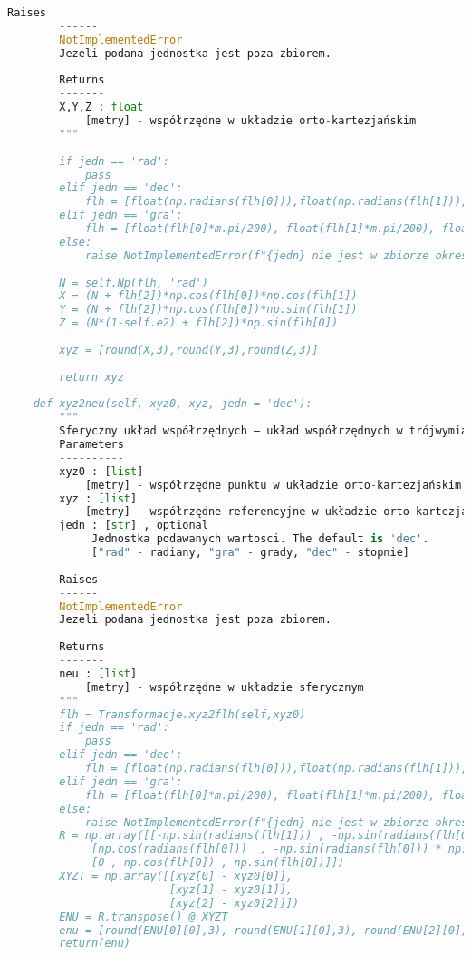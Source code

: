 \begin{lstlisting}[caption={\emph{Treść programu}}, language=Python]
        Raises
        ------
        NotImplementedError
        Jezeli podana jednostka jest poza zbiorem.
       
        Returns
        -------
        X,Y,Z : float
            [metry] - współrzędne w układzie orto-kartezjańskim
        """
        
        if jedn == 'rad':
            pass
        elif jedn == 'dec':
            flh = [float(np.radians(flh[0])),float(np.radians(flh[1])),float(flh[2])]
        elif jedn == 'gra':
            flh = [float(flh[0]*m.pi/200), float(flh[1]*m.pi/200), float(flh[2])]
        else:
            raise NotImplementedError(f"{jedn} nie jest w zbiorze okreslen")
            
        N = self.Np(flh, 'rad')
        X = (N + flh[2])*np.cos(flh[0])*np.cos(flh[1])
        Y = (N + flh[2])*np.cos(flh[0])*np.sin(flh[1])
        Z = (N*(1-self.e2) + flh[2])*np.sin(flh[0])
        
        xyz = [round(X,3),round(Y,3),round(Z,3)]
        
        return xyz
    
    def xyz2neu(self, xyz0, xyz, jedn = 'dec'):
        """
        Sferyczny układ współrzędnych – układ współrzędnych w trójwymiarowej przestrzeni euklidesowej.
        Parameters
        ----------
        xyz0 : [list]
            [metry] - współrzędne punktu w układzie orto-kartezjańskim
        xyz : [list]
            [metry] - współrzędne referencyjne w układzie orto-kartezjańskim
        jedn : [str] , optional
             Jednostka podawanych wartosci. The default is 'dec'.
             ["rad" - radiany, "gra" - grady, "dec" - stopnie]
        
        Raises
        ------
        NotImplementedError
        Jezeli podana jednostka jest poza zbiorem.
       
        Returns
        -------
        neu : [list]
            [metry] - współrzędne w układzie sferycznym
        """
        flh = Transformacje.xyz2flh(self,xyz0)
        if jedn == 'rad':
            pass
        elif jedn == 'dec':
            flh = [float(np.radians(flh[0])),float(np.radians(flh[1])),float(flh[2])]
        elif jedn == 'gra':
            flh = [float(flh[0]*m.pi/200), float(flh[1]*m.pi/200), float(flh[2])]
        else:
            raise NotImplementedError(f"{jedn} nie jest w zbiorze okreslen")
        R = np.array([[-np.sin(radians(flh[1])) , -np.sin(radians(flh[0])) * np.cos(radians(flh[1])) , np.cos(radians(flh[0])) * np.cos(radians(flh[1]))],
             [np.cos(radians(flh[0]))  , -np.sin(radians(flh[0])) * np.sin(radians(flh[1])) , np.cos(radians(flh[0])) * np.sin(radians(flh[1]))],
             [0 , np.cos(flh[0]) , np.sin(flh[0])]])
        XYZT = np.array([[xyz[0] - xyz0[0]],
                         [xyz[1] - xyz0[1]],
                         [xyz[2] - xyz0[2]]])
        ENU = R.transpose() @ XYZT
        enu = [round(ENU[0][0],3), round(ENU[1][0],3), round(ENU[2][0],3)]
        return(enu)
    

\end{lstlisting}
